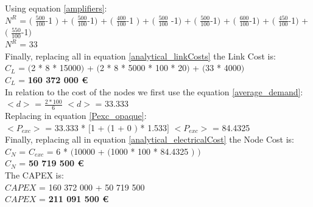 Using equation \ref{amplifiers}:\\

$N^R$ = $($ $\frac{500}{100}$-1 $)$ + $($ $\frac{500}{100}$-1$)$ + $($ $\frac{400}{100}$-1 $)$ + $($ $\frac{500}{100}$ -1$)$ + $($ $\frac{500}{100}$-1$)$ + $($ $\frac{600}{100}$-1$)$ + $($ $\frac{450}{100}$-1$)$ + $($ $\frac{550}{100}$-1$)$\\

$N^R$ = 33\\

Finally, replacing all in equation \ref{analytical_linkCosts} the Link Cost is:\\

$C_L$ = $($2 * 8 * 15000$)$ + $($2 * 8 * 5000 * 100 * 20$)$ + $($33 * 4000$)$\\

$C_L$ = \textbf{160 372 000 \euro}\\

In relation to the cost of the nodes we first use the equation \ref{average_demand}:\\

$<d>$ = $\frac{2 * 100}{6}$ \qquad \qquad $<d>$ = 33.333\\

Replacing in equation \ref{Pexc_opaque}:\\

$<P_{exc}>$ = 33.333 * $[$1 + $($1 + $0$ $)$ * 1.533$]$ \qquad \qquad $<P_{exc}>$ = 84.4325 \\

Finally, replacing all in equation \ref{analytical_electricalCost} the Node Cost is:\\

$C_N$ = $C_{exc}$ = 6 * $($10000 + $($1000 * 100 * 84.4325 $)$ $)$\\

$C_N$ = \textbf{50 719 500 \euro}\\

The CAPEX is:\\
$CAPEX$ = 160 372 000 + 50 719 500\\

$CAPEX$ = \textbf{211 091 500 \euro}\\

